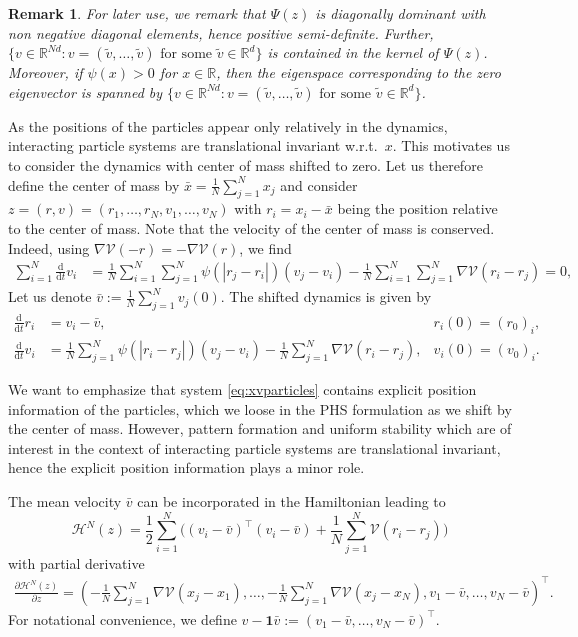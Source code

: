 \documentclass[11pt]{article}
\newtheorem*{remark}{Remark}
\newcommand{\R}[0]{\mathbb R}
\newcommand{\calH}[0]{\mathcal H}
\newcommand{\dd}[0]{\mathrm d}
\newcommand{\sumj}[0]{\sum_{j=1}^N}
\newcommand{\sumi}[0]{\sum_{i=1}^N}
\newcommand{\V}[0]{\mathcal V}
\begin{document}
\begin{bibunit}[abbrv]
\begin{remark}\label{rem:Psi}
For later use, we remark that  $\Psi(z)$ is diagonally dominant with non negative diagonal elements, hence positive semi-definite. Further, $\{ v \in \R^{Nd} : v = (\tilde v, \dots, \tilde v) \text{ for some } \tilde v \in \R^d \} $ is contained in the kernel of $\Psi(z)$. Moreover, if  $\psi(x)>0$  for $x\in\R$, then the eigenspace corresponding to the zero eigenvector is  spanned by $\{ v \in \R^{Nd} : v = (\tilde v, \dots, \tilde v) \text{ for some } \tilde v \in \R^d \} $.
\end{remark}
% 
As the positions of the particles appear only relatively in the dynamics, interacting particle systems are translational invariant w.r.t.~$x$. This motivates us to consider the dynamics with center of mass shifted to zero. Let us therefore  define the center of mass by $\bar x = \frac1N \sumj x_j$ and consider $z=(r,v)=(r_1,\dots,r_N,v_1,\dots,v_N)$ with $r_i = x_i - \bar x$ being the position relative to the center of mass. Note that the velocity of the center of mass is conserved. Indeed, using 
$\nabla \mathcal V(-r) = -\nabla \mathcal V(r)$, we find
\begin{align}\label{eqn:meanv}
\sum_{i=1}^N\frac{\dd}{\dd t} v_i &= \frac{1}{N}\sum_{i=1}^N\sumj \psi(|r_j - r_i|)(v_j - v_i) - \frac{1}{N} \sum_{i=1}^N\sumj \nabla \V(r_i - r_j)=0,
\end{align}
Let us denote $\bar v := \frac1N \sumj v_j(0)$. The shifted dynamics is given by
\begin{subequations}\label{eq:phs}
\begin{align}\label{eqn:phs1}
    \frac{\dd}{\dd t} r_i &= v_i - \bar v,  &r_i(0) = (r_0)_i, \\
    \frac{\dd}{\dd t} v_i &= \frac{1}{N}\sumj \psi(| r_i - r_j |)(v_j - v_i) - \frac{1}{N} \sumj \nabla \mathcal V(r_ i - r_j),  &v_i(0)=(v_0)_i.\label{eqn:phs2}
\end{align}
\end{subequations}

We want to emphasize that system \eqref{eq:xvparticles} contains explicit position information of the particles, which we loose in the PHS formulation as we shift by the center of mass. However, pattern formation and uniform stability which are of interest in the context of interacting particle systems are translational invariant, hence the explicit position information plays a minor role. 

The mean velocity $\bar v$ can be incorporated in the Hamiltonian leading to
\[\calH^N(z) = \frac{1}{2}\sumi \Big((v_i-\bar v)^\top (v_i - \bar v) + \frac{1}{N} \sum_{j=1}^{N}  \V(r_i-r_j) \Big)
\]
with partial derivative
\begin{align*}
\frac{\partial \calH^N(z)}{\partial z} = \left(-\frac{1}{N} \sumj \nabla \V(x_{j} - x_{1}), \ldots,  -\frac{1}{N} \sumj \nabla \V(x_{j} - x_{N}) ,v_1-\bar v, \dots, v_N - \bar v\right)^\top.
\end{align*}
For notational convenience, we define $v-\textbf{1}\bar v:=(v_1-\bar v, \dots, v_N - \bar v)^\top$.


\end{bibunit}
\end{document}

